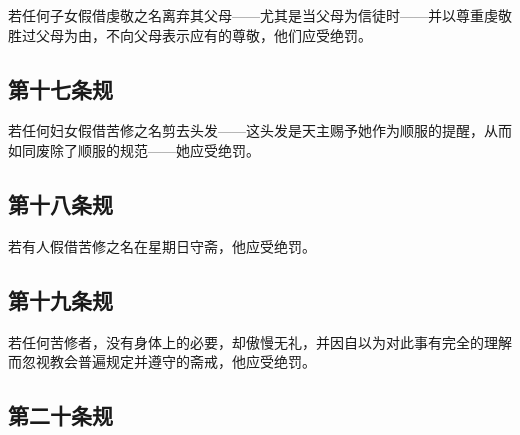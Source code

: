 若任何子女假借虔敬之名离弃其父母——尤其是当父母为信徒时——并以尊重虔敬胜过父母为由，不向父母表示应有的尊敬，他们应受绝罚。\par

\par


\subsection{第十七条规}

若任何妇女假借苦修之名剪去头发——这头发是天主赐予她作为顺服的提醒，从而如同废除了顺服的规范——她应受绝罚。\par

\par


\subsection{第十八条规}

若有人假借苦修之名在星期日守斋，他应受绝罚。\par

\par


\subsection{第十九条规}

若任何苦修者，没有身体上的必要，却傲慢无礼，并因自以为对此事有完全的理解而忽视教会普遍规定并遵守的斋戒，他应受绝罚。\par


\subsection{第二十条规}

